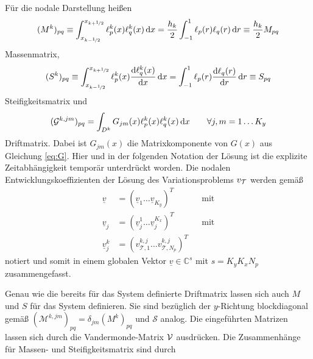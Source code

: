 \begin{definition} \label{def:matrizen}
  Für die nodale Darstellung heißen
  \begin{equation*}
    (M^k)_{pq} \equiv \int_{x_{k-\nicefrac{1}{2}}}^{x_{k+\nicefrac{1}{2}}} \ell_p^k(x) \ell_q^k(x) \mathop{}\!\mathrm{d} x = \frac{h_k}{2}\int_{-1}^1 \ell_p(r) \ell_q(r) \mathop{}\!\mathrm{d} r \equiv \frac{h_k}{2} M_{pq}
  \end{equation*}
  Massenmatrix,
  \begin{equation*}
    (S^k)_{pq} \equiv \int_{x_{k-\nicefrac{1}{2}}}^{x_{k+\nicefrac{1}{2}}} \ell_p^k(x) \frac{\mathrm{d}\ell_q^k(x)}{\mathrm{d}x} \mathop{}\!\mathrm{d} x = \int_{-1}^1 \ell_p(r) \frac{\mathrm{d}\ell_q(r)}{\mathrm{d}r}  \mathop{}\!\mathrm{d} r \equiv S_{pq}
  \end{equation*}
  Steifigkeitsmatrix und
  \begin{equation*}
    (\drift^{k,jm})_{pq} = \int_{D^k} G_{jm}(x) \ell_p^k(x) \ell_q^k(x) \diff x \qquad \forall j,m=1\dots K_y %
  \end{equation*}
  Driftmatrix. Dabei ist $G_{jm}(x)$ die Matrixkomponente von $G(x)$ aus Gleichung \eqref{eq:G}. Hier und in der folgenden Notation der Lösung ist die explizite Zeitabhängigkeit temporär unterdrückt worden. Die nodalen Entwicklungskoeffizienten der Lösung des Variationsproblems $v_{\mathcal{T}}$ werden gemäß
  \begin{equation*}
    \begin{aligned}
      \underline{v} &= (\underline{v}_1 \dots \underline{v}_{K_y})^T        &  &\text{mit} \\
      \underline{v}_j &= (\underline{v}_j^1 \dots \underline{v}_j^{K_x})^T  &  &\text{mit} \\
      \underline{v}_j^k &= (v_{\mathcal{T},1}^{k,j} \dots v_{\mathcal{T},N_p}^{k,j})^T
    \end{aligned}
  \end{equation*}
  notiert und somit in einem globalen Vektor $\underline{v} \in \mathbb{C}^{s}$ mit $s=K_y K_x N_p$ zusammengefasst.
\end{definition}
Genau wie die bereits für das System definierte Driftmatrix lassen sich auch $M$ und $S$ für das System definieren. Sie sind bezüglich der $y$-Richtung blockdiagonal gemäß $(\mathcal{M}^{k,jm})_{pq} = \delta_{jm}(M^k)_{pq}$ und $\mathcal{S}$ analog.
Die eingeführten Matrizen lassen sich durch die Vandermonde-Matrix $\mathcal{V}$ ausdrücken. Die Zusammenhänge für Massen- und Steifigkeitsmatrix sind durch
